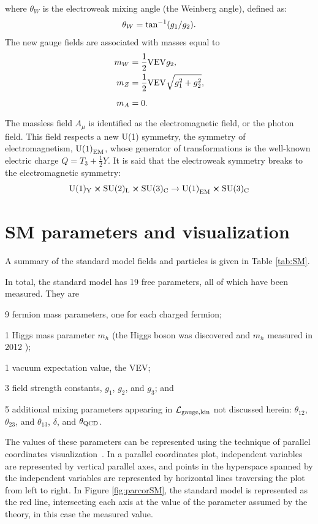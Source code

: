 where $\theta_W$ is the electroweak mixing angle (the Weinberg angle), defined as:
\begin{equation}
\theta_{W}={\rm tan}^{-1}(g_1/g_2).
\end{equation}
The new gauge fields are associated with masses equal to
\begin{align}
\vps m_{W} &= \frac{1}{2}{\rm VEV}g_{2}, \\
\vps m_{Z} &= \frac{1}{2}{\rm VEV}\sqrt{g_{1}^{2}+g_{2}^{2}},\\
\vps m_{A} &= 0.
\end{align}
The massless field $A_{\mu}$ is identified as the electromagnetic field, or the photon field. This field respects a new U(1) symmetry, the symmetry of electromagnetism, ${\rm U(1)}_{\rm EM}$, whose generator of transformations is the well-known electric charge $Q=T_3+\frac{1}{2}Y$. It is said that the electroweak symmetry breaks to the electromagnetic symmetry:
\begin{equation}
\rm U(1)_{Y}\cross\rm SU(2)_{L}\cross\rm SU(3)_{C}\rightarrow{\rm U(1)}_{\rm EM}\cross\rm SU(3)_{C}
\end{equation}

\section{SM parameters and visualization}
\label{sec:parcor}
A summary of the standard model fields and particles is given in Table \ref{tab:SM}.  

In total, the standard model has 19 free parameters, all of which have been measured. They are
\begin{itemize}
\item{9 fermion mass parameters, one for each charged fermion;}
\item{1 Higgs mass parameter $m_h$ (the Higgs boson was discovered and $m_h$ measured in 2012 \cite{Chatrchyan:2012xdj}); 
\item 1 vacuum expectation value, the VEV;}
\item{3 field strength constants, $g_1$, $g_2$, and $g_3$}; and
\item{5 additional mixing parameters appearing in $\mathcal{L}_{\rm gauge, kin}$ not discussed herein: $\theta_{12}$, $\theta_{23}$, and $\theta_{13}$, $\delta$, and $\theta_{\rm QCD}$.}
\end{itemize}

The values of these parameters can be represented using the technique of parallel coordinates visualization~\cite{bib:parcor}. In a parallel coordinates plot, independent variables are represented by vertical parallel axes, and points in the hyperspace spanned by the independent variables are represented by horizontal lines traversing the plot from left to right. In Figure \ref{fig:parcorSM}, the standard model is represented as the red line, intersecting each axis at the value of the parameter assumed by the theory, in this case the measured value.  

